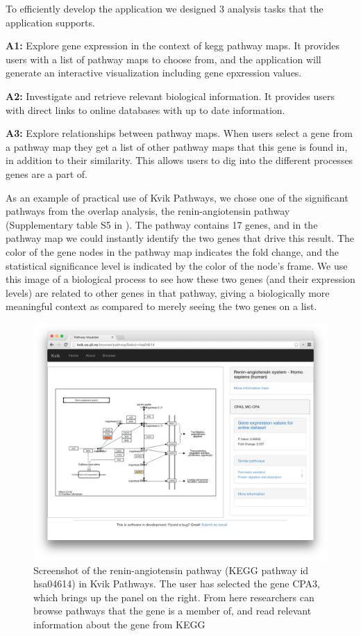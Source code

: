 To efficiently develop the application we designed 3 analysis tasks that the
application supports. 

\textbf{A1:} Explore gene expression in the context of \gls{kegg} pathway maps.
It provides users with a list of pathway maps to choose from, and the
application will generate an interactive visualization including gene epxression
values. 

\textbf{A2:} Investigate and retrieve relevant biological information. It
provides users with direct links to online databases with up to date
information. 

\textbf{A3:} Explore relationships between pathway maps. When users select a
gene from a pathway map they get a list of other pathway maps that this
gene is found in, in addition to their similarity. This allows users to dig into
the different processes genes are a part of. 

As an example of practical use of Kvik Pathways, we chose one of the
significant pathways from the overlap analysis, the renin-angiotensin
pathway (Supplementary table S5 in \cite{olsen2013plasma}). The pathway
contains 17 genes, and in the pathway map we could instantly identify the
two genes that drive this result. The color of the gene nodes in the pathway
map indicates the fold change, and the statistical significance level is
indicated by the color of the node's frame.  We use this image of a
biological process to see how these two genes (and their expression levels)
are related to other genes in that pathway, giving a biologically more
meaningful context as compared to merely seeing the two genes on a list.

\begin{figure}[htb!]
    \begin{centering}
    \includegraphics[width=\textwidth]{figures/kvikpwfig.png}
    \caption{Screenshot of the renin-angiotensin pathway (KEGG pathway id
    hsa04614) in Kvik Pathways. The user has selected the gene CPA3, which brings 
    up the panel on the right. From here researchers can browse pathways that the
    gene is a member of, and read relevant information about the gene from KEGG} 
    \label{kvikpwfig}
    \end{centering} 
\end{figure}


